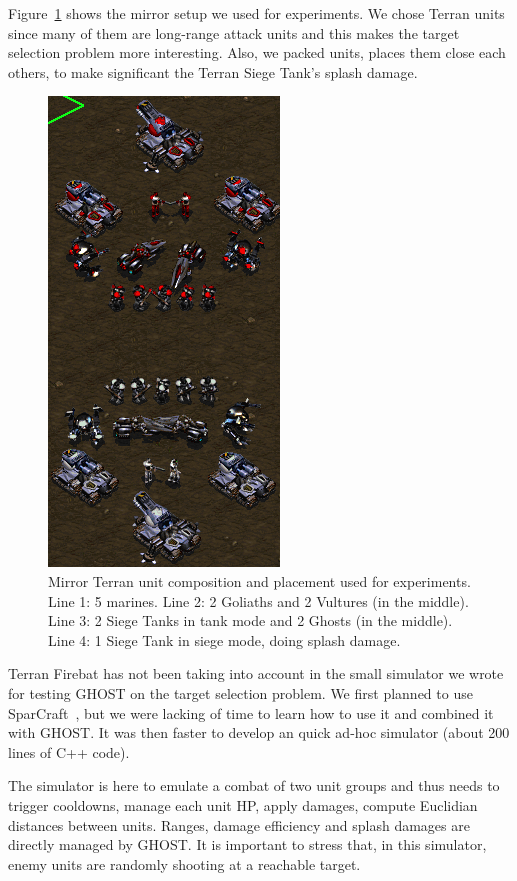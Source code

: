 \documentclass{article}
\newcommand{\ghost}{\textsc{GHOST}\xspace}
\begin{document}
Figure~\ref{fig:target}   shows  the   mirror   setup   we  used   for
experiments. We chose  Terran units since many of  them are long-range
attack  units  and  this  makes  the  target  selection  problem  more
interesting.  Also, we packed units, places them close each others, to
make significant the Terran Siege Tank's splash damage.
\begin{figure}[!t]
  \centering
  \includegraphics[width=0.4\linewidth]{figs/target_setup.png}
  \caption{Mirror  Terran  unit  composition and  placement  used  for
    experiments. Line 1: 5 marines. Line  2: 2 Goliaths and 2 Vultures
    (in the middle). Line  3: 2 Siege Tanks in tank  mode and 2 Ghosts
    (in the middle). Line 4: 1  Siege Tank in siege mode, doing splash
    damage.}
  \label{fig:target}
\end{figure}
Terran Firebat has not been taking into account in the small simulator
we wrote for testing \ghost on the target selection problem.  We first
planned    to    use   SparCraft~\cite{ChurchillB11,    ChurchillSB12,
  ChurchillB12}, but  we were lacking of  time to learn how  to use it
and combined  it with \ghost. It  was then faster to  develop an quick
ad-hoc simulator (about 200 lines of C++ code).

The simulator is here to emulate a  combat of two unit groups and thus
needs  to  trigger cooldowns,  manage  each  unit HP,  apply  damages,
compute Euclidian  distances between units. Ranges,  damage efficiency
and splash damages are directly managed by \ghost.  It is important to
stress that, in this simulator, enemy units are randomly shooting at a
reachable target.
\end{document}
